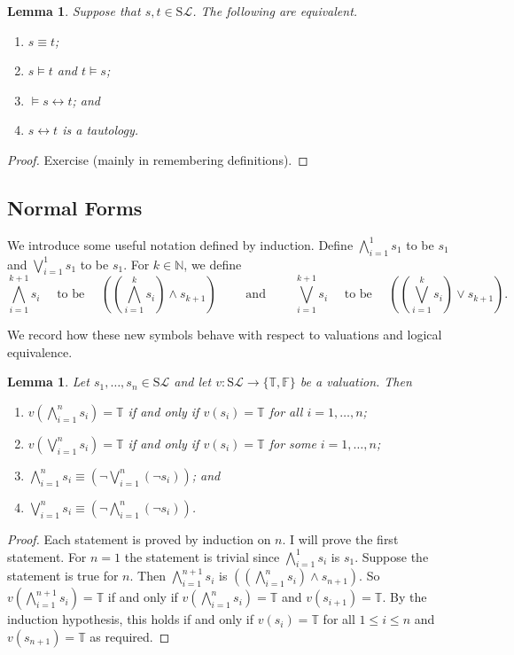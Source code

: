 \documentclass[11pt]{article}
\newcommand{\PF}{\mathrm{S}}
\newtheorem{lemma}[theorem]{Lemma}
\newcommand{\mcal}[1]{\mathcal{#1}}
\newcommand{\N}{\mathbb{N}}
\newcommand{\F}{\mathbb{F}}
\newcommand{\T}{\mathbb{T}}
\begin{document}
\begin{lemma}
Suppose that $s,t\in\PF\mcal{L}$. The following are equivalent.
\begin{enumerate}
\item $s\equiv t$;
\item $s\models t$ and $t\models s$;
\item $\models s\leftrightarrow t$; and
\item $s\leftrightarrow t$ is a tautology.
\end{enumerate}
\end{lemma}
\begin{proof}
Exercise (mainly in remembering definitions).
\end{proof}



\subsection*{Normal Forms}

We introduce some useful notation defined by induction. Define $\bigwedge_{i=1}^1 s_1$ to be $s_1$ and $\bigvee_{i=1}^1s_1$ to be $s_1$. For $k\in \N$, we define
\[\bigwedge_{i=1}^{k+1}s_i \quad\text{ to be }\quad (\left(\bigwedge_{i=1}^{k}s_i\right)\wedge s_{k+1}) \qquad\text{ and }\qquad \bigvee_{i=1}^{k+1}s_i \quad\text{ to be }\quad (\left(\bigvee_{i=1}^{k}s_i\right)\vee s_{k+1}).\]

We record how these new symbols behave with respect to valuations and logical equivalence.

\begin{lemma}
Let $s_1,\ldots, s_n\in\PF\mcal{L}$ and let $v:\PF\mcal{L}\rightarrow \{\T,\F\}$ be a valuation. Then
\begin{enumerate}
\item $v(\bigwedge_{i=1}^ns_i)=\T$ if and only if $v(s_i)=\T$ for all $i=1,\ldots,n$;
\item $v(\bigvee_{i=1}^ns_i)=\T$ if and only if $v(s_i)=\T$ for some $i=1,\ldots,n$;
\item $\bigwedge_{i=1}^ns_i\equiv (\neg\bigvee_{i=1}^n (\neg s_i))$; and
\item $\bigvee_{i=1}^ns_i\equiv (\neg\bigwedge_{i=1}^n (\neg s_i))$.
\end{enumerate}
\end{lemma}
\begin{proof}
Each statement is proved by induction on $n$. I will prove the first statement. For $n=1$ the statement is trivial since $\bigwedge_{i=1}^1s_i$ is $s_1$. Suppose the statement is true for $n$. Then $\bigwedge_{i=1}^{n+1}s_i$ is $((\bigwedge_{i=1}^ns_i)\wedge s_{n+1})$. So $v(\bigwedge_{i=1}^{n+1}s_i)=\T$ if and only if $v(\bigwedge_{i=1}^ns_i)=\T$ and $v(s_{i+1})=\T$. By the induction hypothesis, this holds if and only if $v(s_i)=\T$ for all $1\leq i\leq n$ and $v(s_{n+1})=\T$ as required.
\end{proof}
\end{document}
